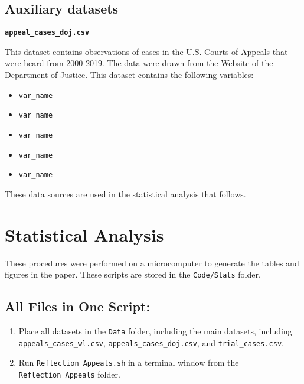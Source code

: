 \documentclass[11pt]{paper}
\begin{document}
\subsection*{Auxiliary datasets}

\noindent\textbf{\texttt{appeal\_cases\_doj.csv}}

This dataset contains observations of cases in the U.S. Courts of Appeals
that were heard from 2000-2019.  
The data were drawn from the Website of the Department of Justice. 
This dataset contains the following variables:

\begin{itemize}

\item \texttt{var\_name} 
\item \texttt{var\_name} 
\item \texttt{var\_name} 
\item \texttt{var\_name} 
\item \texttt{var\_name} 

\end{itemize}


These data sources are used in the statistical analysis that follows. 



\section*{Statistical Analysis}

These procedures were performed on a microcomputer
to generate the tables and figures in the paper.
These scripts are stored in the \texttt{Code/Stats} folder. 

\subsection*{All Files in One Script:}


\begin{enumerate}

\item Place all datasets in the \texttt{Data} folder, 
including the main datasets, including  
\texttt{appeals\_cases\_wl.csv}, \texttt{appeals\_cases\_doj.csv}, 
and \texttt{trial\_cases.csv}. 
 
\item Run \texttt{Reflection\_Appeals.sh} in a terminal window from the \texttt{Reflection\_Appeals} folder. 

\end{enumerate}
\end{document}
